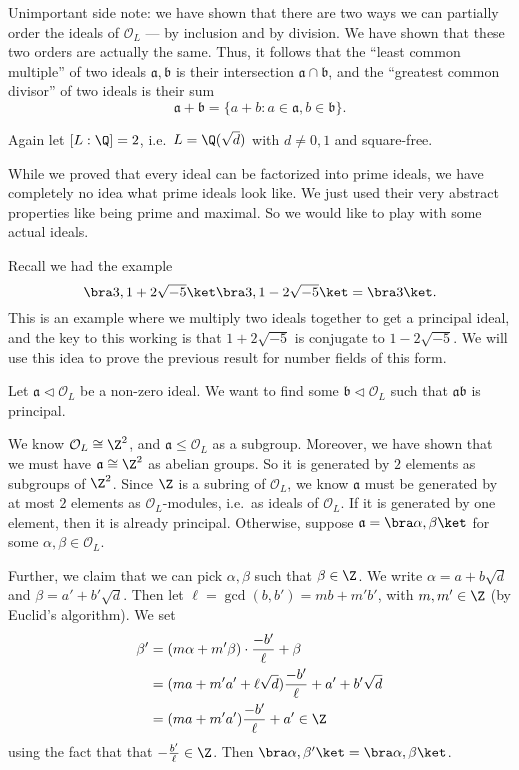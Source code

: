 \documentclass[a4paper]{article}
\begin{document}
Unimportant side note: we have shown that there are two ways we can partially order the ideals of $\mathcal{O}_L$ --- by inclusion and by division. We have shown that these two orders are actually the same. Thus, it follows that the ``least common multiple'' of two ideals $\mathfrak{a}, \mathfrak{b}$ is their intersection $\mathfrak{a} \cap \mathfrak{b}$, and the ``greatest common divisor'' of two ideals is their sum
\[
  \mathfrak{a} + \mathfrak{b} = \{a + b: a \in \mathfrak{a}, b \in \mathfrak{b}\}.
\]

\begin{eg}
  Again let $[L:\Q] = 2$, i.e.\ $L = \Q(\sqrt{d})$ with $d \not= 0, 1$ and square-free.

  While we proved that every ideal can be factorized into prime ideals, we have completely no idea what prime ideals look like. We just used their very abstract properties like being prime and maximal. So we would like to play with some actual ideals.

  Recall we had the example
  \[
    \bra 3, 1 + 2\sqrt{-5}\ket \bra 3, 1 - 2\sqrt{-5}\ket = \bra 3\ket.
  \]
  This is an example where we multiply two ideals together to get a principal ideal, and the key to this working is that $1 + 2\sqrt{-5}$ is conjugate to $1 - 2\sqrt{-5}$. We will use this idea to prove the previous result for number fields of this form.

  Let $\mathfrak{a} \lhd \mathcal{O}_L$ be a non-zero ideal. We want to find some $\mathfrak{b} \lhd \mathcal{O}_L$ such that $\mathfrak{a}\mathfrak{b}$ is principal.

  We know $\mathcal{O}_L \cong \Z^2$, and $\mathfrak{a} \leq \mathcal{O}_L$ as a subgroup. Moreover, we have shown that we must have $\mathfrak{a} \cong \Z^2$ as abelian groups. So it is generated by $2$ elements as subgroups of $\Z^2$. Since $\Z$ is a subring of $\mathcal{O}_L$, we know $\mathfrak{a}$ must be generated by at most $2$ elements as $\mathcal{O}_L$-modules, i.e.\ as ideals of $\mathcal{O}_L$. If it is generated by one element, then it is already principal. Otherwise, suppose $\mathfrak{a} = \bra \alpha, \beta\ket$ for some $\alpha, \beta \in \mathcal{O}_L$.

  Further, we claim that we can pick $\alpha, \beta$ such that $\beta \in \Z$. We write $\alpha = a + b \sqrt{d}$ and $\beta = a' + b' \sqrt{d}$. Then let $\ell = \gcd(b, b') = mb + m' b'$, with $m, m' \in \Z$ (by Euclid's algorithm). We set
  \begin{align*}
    \beta' &= (m\alpha + m' \beta)\cdot \frac{-b'}{\ell} + \beta\\
    &= (ma + m' a' + \ell \sqrt{d}) \frac{-b'}{\ell} + a' + b'\sqrt{d}\\
    &= (ma + m'a') \frac{-b'}{\ell} + a' \in \Z
  \end{align*}
  using the fact that that $-\frac{b'}{\ell} \in \Z$. Then $\bra \alpha, \beta'\ket = \bra \alpha, \beta\ket$.


\end{eg}
\end{document}
